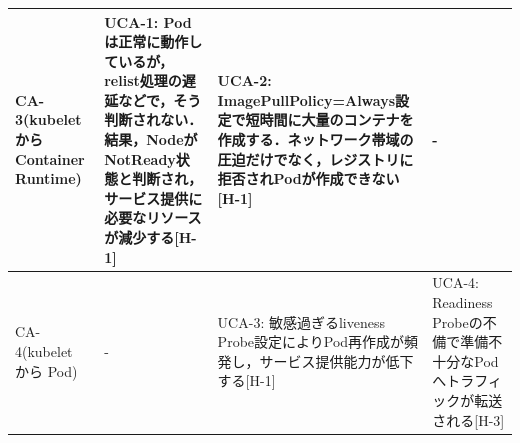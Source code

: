 \documentclass[12pt,a4j]{ujreport}
\begin{document}
\begin{footnotesize}
\begin{tabularx}{\linewidth}{
            >{\hsize=0.7\hsize}X|
            >{\hsize=1.1\hsize}X|
            >{\hsize=1.1\hsize}X|
            >{\hsize=1.1\hsize}X
        }
        CA-3(kubelet から Container Runtime)                          & UCA-1: Podは正常に動作しているが，relist処理の遅延などで，そう判断されない．結果，NodeがNotReady状態と判断され，サービス提供に必要なリソースが減少する[H-1]                                                                                                                                                                                                                                                                                                                                                & UCA-2: ImagePullPolicy=Always設定で短時間に大量のコンテナを作成する．ネットワーク帯域の圧迫だけでなく，レジストリに拒否されPodが作成できない[H-1]                                                                                                                                                                               & -                                                                                                                                    \\ \hline
        CA-4(kubelet から Pod)                                        & -                                                                                                                                                                                                                                                                                                                                                                                                                                                                                                          & UCA-3: 敏感過ぎるliveness Probe設定によりPod再作成が頻発し，サービス提供能力が低下する[H-1]                                                                                                                                                                                                                                     & UCA-4: Readiness Probeの不備で準備不十分なPodへトラフィックが転送される[H-3]                                                         \\ \hline

\end{tabularx}
\end{footnotesize}
\end{document}
